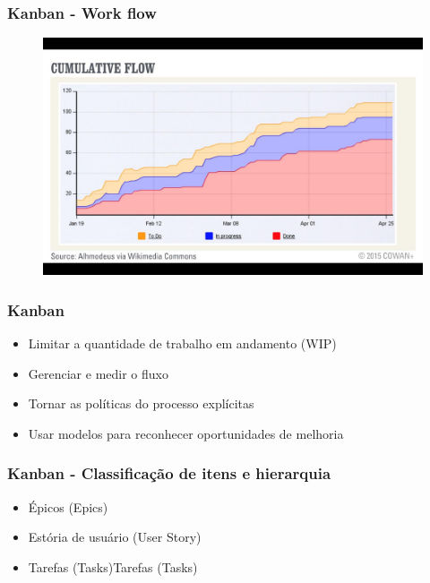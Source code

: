 \begin{frame}
 \frametitle{Kanban - Work flow}
  \begin{figure}
   \centering
   \includegraphics[width = \textwidth]{figs/workflow.png}
  \end{figure}
\end{frame}

\begin{frame}
 \frametitle{Kanban}
  \begin{itemize}
  \item Limitar a quantidade de trabalho em andamento (WIP)
  \item Gerenciar e medir o fluxo
  \item Tornar as políticas do processo explícitas
  \item Usar modelos para reconhecer oportunidades de melhoria
 \end{itemize}
\end{frame}

\begin{frame}
 \frametitle{Kanban - Classificação de itens e hierarquia}
  \begin{itemize}
  \item Épicos (Epics)
  \item Estória de usuário (User Story)
  \item Tarefas (Tasks)Tarefas (Tasks)
 \end{itemize}
\end{frame}

